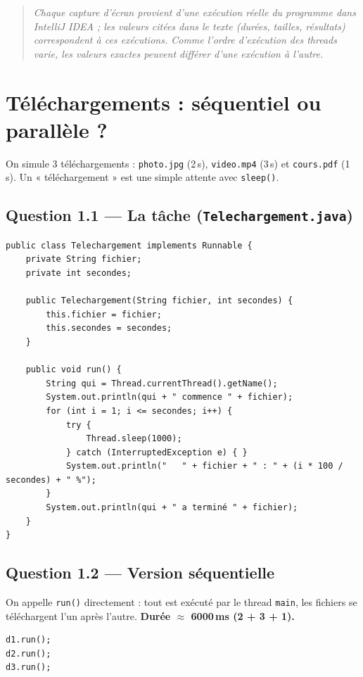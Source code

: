 \documentclass[11pt,a4paper]{article}
\begin{document}
\begin{quote}\small\itshape
Chaque capture d'écran provient d'une exécution réelle du programme dans IntelliJ
IDEA ; les valeurs citées dans le texte (durées, tailles, résultats) correspondent à
ces exécutions. Comme l'ordre d'exécution des threads varie, les valeurs exactes
peuvent différer d'une exécution à l'autre.
\end{quote}

\section{Téléchargements : séquentiel ou parallèle ?}
On simule 3 téléchargements : \texttt{photo.jpg} (2\,s), \texttt{video.mp4} (3\,s)
et \texttt{cours.pdf} (1\,s). Un « téléchargement » est une simple attente avec
\texttt{sleep()}.

\subsection{Question 1.1 — La tâche (\texttt{Telechargement.java})}
\begin{lstlisting}
public class Telechargement implements Runnable {
    private String fichier;
    private int secondes;

    public Telechargement(String fichier, int secondes) {
        this.fichier = fichier;
        this.secondes = secondes;
    }

    public void run() {
        String qui = Thread.currentThread().getName();
        System.out.println(qui + " commence " + fichier);
        for (int i = 1; i <= secondes; i++) {
            try {
                Thread.sleep(1000);
            } catch (InterruptedException e) { }
            System.out.println("   " + fichier + " : " + (i * 100 / secondes) + " %");
        }
        System.out.println(qui + " a terminé " + fichier);
    }
}
\end{lstlisting}

\subsection{Question 1.2 — Version séquentielle}
On appelle \texttt{run()} directement : tout est exécuté par le thread \texttt{main},
les fichiers se téléchargent l'un après l'autre. \textbf{Durée $\approx$ 6000\,ms
(2 + 3 + 1).}
\begin{lstlisting}
d1.run();
d2.run();
d3.run();
\end{lstlisting}
\end{document}
